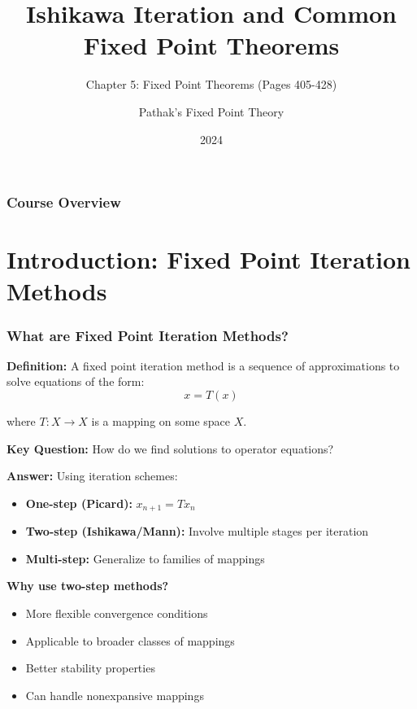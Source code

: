 \documentclass[aspectratio=169,10pt]{beamer}
\title{Ishikawa Iteration and Common Fixed Point Theorems}
\subtitle{Chapter 5: Fixed Point Theorems (Pages 405-428)}
\author{Pathak's Fixed Point Theory}
\date{2024}
\begin{document}
\frame{\titlepage}

\begin{frame}
\frametitle{Course Overview}
\tableofcontents
\end{frame}

\section{Introduction: Fixed Point Iteration Methods}

\begin{frame}[allowframebreaks]
\frametitle{What are Fixed Point Iteration Methods?}

\textbf{Definition:} A fixed point iteration method is a sequence of approximations to solve equations of the form:
$$x = T(x)$$

where $T: X \to X$ is a mapping on some space $X$.

\vspace{0.3cm}

\textbf{Key Question:} How do we find solutions to operator equations?

\vspace{0.3cm}

\textbf{Answer:} Using iteration schemes:
\begin{itemize}
    \item \textbf{One-step (Picard):} $x_{n+1} = Tx_n$
    \vspace{0.2cm}
    \item \textbf{Two-step (Ishikawa/Mann):} Involve multiple stages per iteration
    \vspace{0.2cm}
    \item \textbf{Multi-step:} Generalize to families of mappings
\end{itemize}

\vspace{0.3cm}

\textbf{Why use two-step methods?}
\begin{itemize}
    \item More flexible convergence conditions
    \item Applicable to broader classes of mappings
    \item Better stability properties
    \item Can handle nonexpansive mappings
\end{itemize}

\end{frame}
\end{document}
